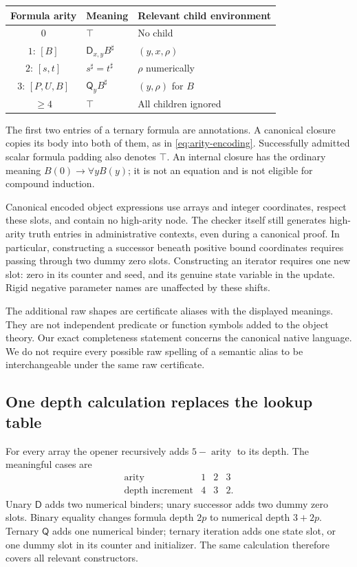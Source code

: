 \documentclass[11pt,letterpaper]{article}
\theoremstyle{definition}
\theoremstyle{remark}
\newcommand{\D}{\mathsf D}
\newcommand{\Q}{\mathsf Q}
\begin{document}
\begin{center}
\begin{tabular}{cll}
\toprule
Formula arity & Meaning & Relevant child environment\\
\midrule
$0$ & $\top$ & No child\\
$1$: $[B]$ & $\D_{x,y}B^\sharp$ & $(y,x,\rho)$\\
$2$: $[s,t]$ & $s^\sharp=t^\sharp$ & $\rho$ numerically\\
$3$: $[P,U,B]$ & $\Q_yB^\sharp$ & $(y,\rho)$ for $B$\\
$\geq4$ & $\top$ & All children ignored\\
\bottomrule
\end{tabular}
\end{center}

The first two entries of a ternary formula are annotations.  A canonical
closure copies its body into both of them, as in
\eqref{eq:arity-encoding}.  Successfully admitted scalar formula padding
also denotes $\top$.  An internal closure has the ordinary meaning
$B(0)\to\forall yB(y)$; it is not an equation and is not eligible for
compound induction.

Canonical encoded object expressions use arrays and integer coordinates,
respect these slots, and contain no high-arity node.  The checker itself
still generates high-arity truth entries in administrative contexts,
even during a canonical proof.  In particular, constructing a
successor beneath positive bound coordinates requires passing through
two dummy zero slots.  Constructing an iterator requires one new slot:
zero in its counter and seed, and its genuine state variable in the
update.  Rigid negative parameter names are unaffected by these shifts.

The additional raw shapes are certificate aliases with the displayed
meanings.  They are not independent predicate or function symbols added
to the object theory.  Our exact completeness statement concerns the
canonical native language.  We do not require every possible raw spelling
of a semantic alias to be interchangeable under the same raw certificate.

\subsection{One depth calculation replaces the lookup table}

For every array the opener recursively adds $5-\operatorname{arity}$
to its depth.  The meaningful cases are
\[
\begin{array}{c|ccc}
 \operatorname{arity}&1&2&3\\\hline
 \text{depth increment}&4&3&2.
\end{array}
\]
Unary $\D$ adds two numerical binders; unary successor adds two dummy
zero slots.  Binary equality changes formula depth $2p$ to numerical
depth $3+2p$.  Ternary $\Q$ adds one numerical binder; ternary iteration
adds one state slot, or one dummy slot in its counter and initializer.
The same calculation therefore covers all relevant constructors.
\end{document}
